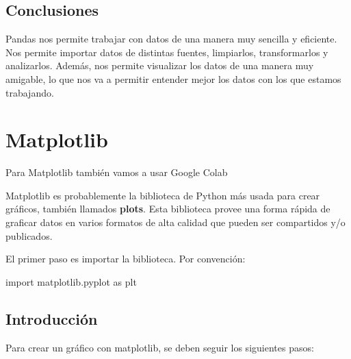 \documentclass[
  letterpaper,
  DIV=11,
  numbers=noendperiod]{scrreprt}
\newenvironment{Shaded}{\begin{snugshade}}{\end{snugshade}}
\newcommand{\ImportTok}[1]{\textcolor[rgb]{0.00,0.46,0.62}{#1}}
\newcommand{\NormalTok}[1]{\textcolor[rgb]{0.00,0.23,0.31}{#1}}
\begin{document}
\subsection{Conclusiones}\label{conclusiones-2}

Pandas nos permite trabajar con datos de una manera muy sencilla y
eficiente. Nos permite importar datos de distintas fuentes, limpiarlos,
transformarlos y analizarlos. Además, nos permite visualizar los datos
de una manera muy amigable, lo que nos va a permitir entender mejor los
datos con los que estamos trabajando.

\section{Matplotlib}\label{matplotlib}

\begin{tcolorbox}[enhanced jigsaw, arc=.35mm, toptitle=1mm, colframe=quarto-callout-note-color-frame, bottomtitle=1mm, opacitybacktitle=0.6, colbacktitle=quarto-callout-note-color!10!white, leftrule=.75mm, coltitle=black, toprule=.15mm, titlerule=0mm, title=\textcolor{quarto-callout-note-color}{\faInfo}\hspace{0.5em}{Note}, bottomrule=.15mm, rightrule=.15mm, colback=white, breakable, opacityback=0, left=2mm]

Para Matplotlib también vamos a usar Google Colab

\end{tcolorbox}

Matplotlib es probablemente la biblioteca de Python más usada para crear
gráficos, también llamados \textbf{plots}. Esta biblioteca provee una
forma rápida de graficar datos en varios formatos de alta calidad que
pueden ser compartidos y/o publicados.

El primer paso es importar la biblioteca. Por convención:

\begin{Shaded}
\begin{Highlighting}[]
\ImportTok{import}\NormalTok{ matplotlib.pyplot }\ImportTok{as}\NormalTok{ plt}
\end{Highlighting}
\end{Shaded}

\subsection{Introducción}\label{introducciuxf3n-2}

Para crear un gráfico con matplotlib, se deben seguir los siguientes
pasos:
\end{document}
